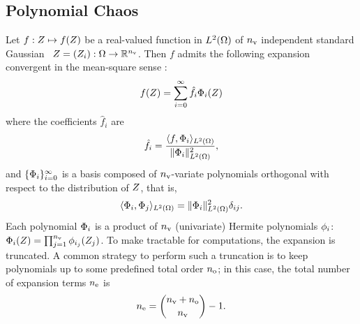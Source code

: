\subsection{Polynomial Chaos} 
Let $f: Z \mapsto f(Z)$ be a real-valued function in ${L^{2}(\Omega)}$ of ${n_\text{v}}$ independent standard Gaussian \rvs\ $Z = (Z_i): \Omega \to \mathbb{R}^{n_\text{v}}$. Then $f$ admits the following expansion convergent in the mean-square sense \cite{maitre2010}:
\begin{equation} \elabel{pc-expansion}
  f(\vZ) = \sum_{i = 0}^\infty \hat{f}_i \vpcb_i(\vZ)
\end{equation}
where the coefficients $\hat{f}_i$ are
\begin{equation} \elabel{pc-coefficient}
  \hat{f}_i  = \frac{\iprod{f, \vpcb_i}_\H}{\norm{\vpcb_i}^2_\H},
\end{equation}
and $\{ \Phi_i \}_{i = 0}^\infty$ is a basis composed of ${n_\text{v}}$-variate polynomials orthogonal with respect to the distribution of $Z$, that is,
\[
  \langle \Phi_i, \Phi_j \rangle_{L^{2}(\Omega)} = \| \Phi_i \|^2_{L^{2}(\Omega)} \delta_{ij}.
\]
Each polynomial $\Phi_i$ is a product of ${n_\text{v}}$ (univariate) Hermite polynomials $\phi_i$: $\Phi_i(Z) = \prod_{j = 1}^{n_\text{v}} \phi_{i_j}(Z_j)$. To make  tractable for computations, the expansion is truncated. A common strategy to perform such a truncation is to keep polynomials up to some predefined total order ${n_\text{o}}$; in this case, the total number of expansion terms ${n_\text{e}}$ is
\[
  {n_\text{e}} = {{n_\text{v}} + {n_\text{o}} \choose {n_\text{v}}} - 1.
\]
